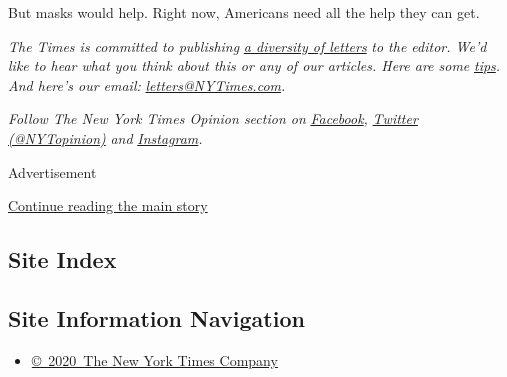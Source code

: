 But masks would help. Right now, Americans need all the help they can
get.

\emph{The Times is committed to publishing}
\href{https://www.nytimes3xbfgragh.onion/2019/01/31/opinion/letters/letters-to-editor-new-york-times-women.html}{\emph{a
diversity of letters}} \emph{to the editor. We'd like to hear what you
think about this or any of our articles. Here are some}
\href{https://help.nytimes3xbfgragh.onion/hc/en-us/articles/115014925288-How-to-submit-a-letter-to-the-editor}{\emph{tips}}\emph{.
And here's our email:}
\href{mailto:letters@NYTimes.com}{\emph{letters@NYTimes.com}}\emph{.}

\emph{Follow The New York Times Opinion section on}
\href{https://www.facebookcorewwwi.onion/nytopinion}{\emph{Facebook}}\emph{,}
\href{http://twitter.com/NYTOpinion}{\emph{Twitter (@NYTopinion)}}
\emph{and}
\href{https://www.instagram.com/nytopinion/}{\emph{Instagram}}\emph{.}

Advertisement

\protect\hyperlink{after-bottom}{Continue reading the main story}

\hypertarget{site-index}{%
\subsection{Site Index}\label{site-index}}

\hypertarget{site-information-navigation}{%
\subsection{Site Information
Navigation}\label{site-information-navigation}}

\begin{itemize}
\tightlist
\item
  \href{https://help.nytimes3xbfgragh.onion/hc/en-us/articles/115014792127-Copyright-notice}{©~2020~The
  New York Times Company}
\end{itemize}

